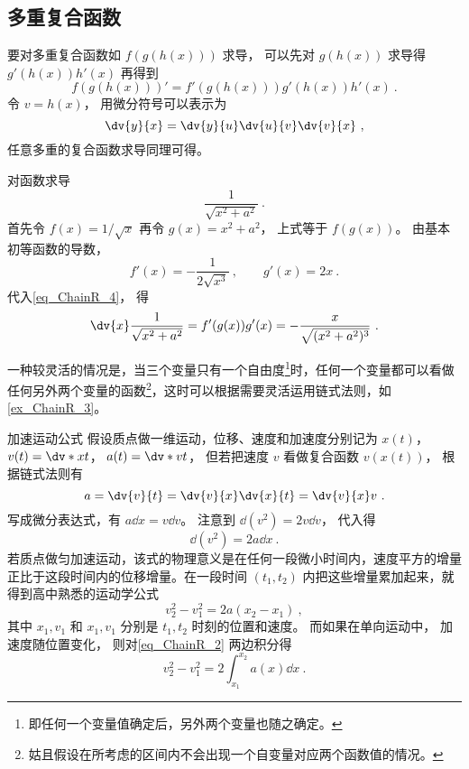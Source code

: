 \subsection{多重复合函数}
要对多重复合函数如 $f(g(h(x)))$ 求导， 可以先对 $g(h(x))$ 求导得 $g'(h(x))h'(x)$ 再得到
\begin{equation}
f(g(h(x)))' = f'(g(h(x)))g'(h(x))h'(x)~.
\end{equation}
令 $v = h(x)$， 用微分符号可以表示为
\begin{equation}
\dv{y}{x} = \dv{y}{u}\dv{u}{v}\dv{v}{x}~,
\end{equation}
任意多重的复合函数求导同理可得。

\begin{example}{对函数求导}
\begin{equation}
\frac{1}{\sqrt{x^2+a^2}}~.
\end{equation}
首先令 $f(x) = 1/\sqrt{x}$ 再令 $g(x) = x^2+a^2$， 上式等于 $f(g(x))$。 由基本初等函数的导数，
\begin{equation}
f'(x) = -\frac{1}{2\sqrt{x^3}} ~, \qquad g'(x) = 2x~.
\end{equation}
代入\autoref{eq_ChainR_4}， 得
\begin{equation}
\dv{x} \frac{1}{\sqrt{x^2+a^2}} =  f'(g(x)) g'(x) = -\frac{x}{\sqrt{(x^2+a^2)^3}}~.
\end{equation}
\end{example}

一种较灵活的情况是，当三个变量只有一个自由度\footnote{即任何一个变量值确定后，另外两个变量也随之确定。}时，任何一个变量都可以看做任何另外两个变量的函数\footnote{姑且假设在所考虑的区间内不会出现一个自变量对应两个函数值的情况。}，这时可以根据需要灵活运用链式法则，如\autoref{ex_ChainR_3}。

\begin{example}{加速运动公式}\label{ex_ChainR_3}
假设质点做一维运动，位移、速度和加速度分别记为 $x(t)$，  $v(t) = \dv*{x}{t}$，  $a(t) = \dv*{v}{t}$， 但若把速度 $v$ 看做复合函数 $v(x(t))$， 根据链式法则有
\begin{equation}
a = \dv{v}{t} = \dv{v}{x}\dv{x}{t} = \dv{v}{x}v~.
\end{equation}
写成微分表达式，有 $a\dd{x} = v\dd{v}$。 注意到 $\dd (v^2) = 2v\dd{v}$， 代入得
\begin{equation}\label{eq_ChainR_2}
\dd(v^2) = 2a \dd{x}~.
\end{equation}
若质点做匀加速运动，该式的物理意义是在任何一段微小时间内，速度平方的增量正比于这段时间内的位移增量。在一段时间 $(t_1,t_2)$ 内把这些增量累加起来，就得到高中熟悉的运动学公式
\begin{equation}
v_2^2-v_1^2 = 2a(x_2-x_1)~,
\end{equation}
其中 $x_1,v_1$ 和 $x_1,v_1$ 分别是 $t_1,t_2$ 时刻的位置和速度。 而如果在单向运动中， 加速度随位置变化， 则对\autoref{eq_ChainR_2} 两边积分得
\begin{equation}
v_2^2 - v_1^2 = 2\int_{x_1}^{x_2}a(x)\dd{x}~.
\end{equation}
\end{example}

